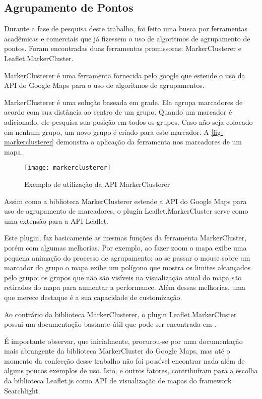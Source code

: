 \subsection{Agrupamento de Pontos\label{sec:markercluster}}
		Durante a fase de pesquisa deste trabalho, foi feito uma busca por ferramentas acadêmicas e comerciais que já fizessem o uso de algoritmos de agrupamento de pontos. Foram encontradas duas ferramentas promissoras: MarkerClusterer e Leaflet.MarkerCluster.
		
		
		MarkerClusterer \cite[p. 188]{livroGoogleApiV3} é uma ferramenta fornecida pelo google que estende o uso da API do Google Maps para o uso de algoritmos de agrupamentos.
		
		MarkerClusterer é uma solução baseada em grade. Ela agrupa marcadores de acordo com sua distância ao centro de um grupo. Quando um marcador é adicionado, ele pesquisa sua posição em todos os grupos. Caso não seja colocado em nenhum grupo, um novo grupo é criado para este marcador. A \autoref{fig-markerclusterer} demonstra a aplicação da ferramenta nos marcadores de um mapa.
	\begin{figure}[htb]
	\caption{\label{fig-markerclusterer}Exemplo de utilização da API MarkerClusterer }
	\begin{center}
	    \texttt{[image: markerclusterer]}
	\end{center}
\end{figure}

		Assim como a biblioteca MarkerClusterer estende a API do Google Maps para uso de agrupamento de marcadores, o plugin Leaflet.MarkerCluster\cite{gitleafletmarker} serve como uma extensão para a API Leaflet. 
		
		Este plugin, faz basicamente as mesmas funções da ferramenta MarkerCluster, porém com algumas melhorias. Por exemplo, ao fazer zoom o mapa exibe uma pequena animação do processo de agrupamento; ao se passar o mouse sobre um marcador do grupo o mapa exibe um polígono que mostra os limites alcançados pelo grupo; os grupos que não são visíveis  na visualização atual do mapa são retirados do mapa para aumentar a performance. Além dessas melhorias, uma que merece destaque é a sua capacidade de customização. 

		Ao contrário da biblioteca MarkerClusterer, o plugin Leaflet.MarkerCluster possui um documentação bastante útil que pode ser encontrada em \cite{gitleafletmarker}. 
		
		É importante observar, que inicialmente, procurou-se por uma documentação mais abrangente da biblioteca MarkerCluster do Google Maps, mas até o momento da confecção desse trabalho não foi possível encontrar nada além de alguns poucos exemplos de uso. Isto, e outros fatores, contribuíram para a escolha da biblioteca Leaflet.js como API de visualização de mapas do framework Searchlight.
		  

